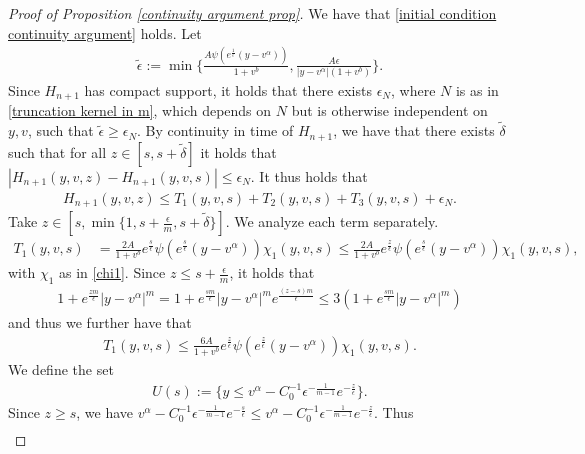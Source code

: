 \documentclass[11pt]{article}
\numberwithin{equation}{section}
\begin{document}
\begin{proof}[Proof of Proposition \ref{continuity argument prop}]
We have that \eqref{initial condition continuity argument} holds. Let 
\begin{align}\label{definition epsilon tilde}
\tilde{\epsilon}:=\min\{\frac{A\psi(e^{\frac{1}{\epsilon}}(y-v^{\alpha}))}{1+v^{b}},\frac{A\epsilon}{|y-v^{\alpha}|(1+v^{b})}\}.
\end{align} Since $H_{n+1}$ has compact support, it holds that there exists $\epsilon_{N}$, where $N$ is as in \eqref{truncation kernel in m}, which depends on $N$ but is otherwise independent on $y,v$, such that $\tilde{\epsilon}\geq \epsilon_{N}$. By continuity in time of $H_{n+1}$, we have that there exists  $\tilde{\delta}$ such that for all $z\in[s,s+\tilde{\delta}]$ it holds that $|H_{n+1}(y,v,z)- H_{n+1}(y,v,s)|\leq \epsilon_{N}$. It thus holds that
\begin{align*}
H_{n+1}(y,v,z)\leq  T_{1}(y,v,s)+T_{2}(y,v,s)+T_{3}(y,v,s)+\epsilon_{N}.
\end{align*}
Take $z\in[s,\min\{1,s+\frac{\epsilon}{m},s+\tilde{\delta}\}]$. We analyze each term separately.
\begin{align*}
  T_{1}(y,v,s)&=   \frac{2A}{1+v^{b}}e^{\frac{s}{\epsilon}}\psi(e^{\frac{s}{\epsilon}}(y-v^{\alpha}))\chi_{1}(y,v,s)\leq  \frac{2A}{1+v^{b}}e^{\frac{z}{\epsilon}}\psi(e^{\frac{s}{\epsilon}}(y-v^{\alpha}))\chi_{1}(y,v,s),
\end{align*}
with $\chi_{1}$ as in \eqref{chi1}. Since $z\leq s+\frac{\epsilon}{m}$, it holds that 
\begin{align}\label{bound t1 and t3}
1+e^{\frac{zm}{\epsilon}}|y-v^{\alpha}|^{m}=1+e^{\frac{sm}{\epsilon}}|y-v^{\alpha}|^{m}e^{\frac{(z-s)m}{\epsilon}}\leq 3(1+e^{\frac{sm}{\epsilon}}|y-v^{\alpha}|^{m})
\end{align}and thus we further have that
\begin{align*}
  T_{1}(y,v,s)\leq  \frac{6A }{1+v^{b}}e^{\frac{z}{\epsilon}}\psi(e^{\frac{z}{\epsilon}}(y-v^{\alpha}))\chi_{1}(y,v,s).
\end{align*}
We define the set
\begin{align*}
    U(s):=\{y\leq  v^{\alpha}-C_{0}^{-1}\epsilon^{-\frac{1}{m-1}}  e^{-\frac{z}{\epsilon}}\}.
\end{align*}Since $z\geq s$, we have $v^{\alpha}-C_{0}^{-1}\epsilon^{-\frac{1}{m-1}}  e^{-\frac{s}{\epsilon}}\leq v^{\alpha}-C_{0}^{-1}\epsilon^{-\frac{1}{m-1}}  e^{-\frac{z}{\epsilon}}$. Thus
\begin{align}\label{t1 bound continuity first}

\end{align}
\end{proof}
\end{document}
